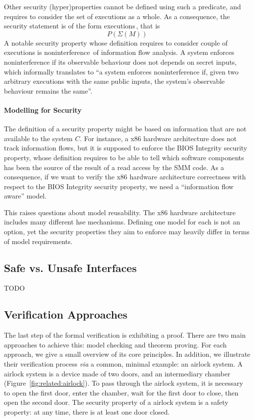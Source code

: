 Other security (hyper)properties cannot be defined using such a predicate, and
requires to consider the set of executions as a whole. As a consequence, the
security statement is of the form
executions\,\cite{clarkson2010hyperproperties}, that is
%
\[
  P(\Sigma(M))
\]
%
A notable security property whose definition requires to consider couple of
executions is noninterference\,\cite{goguen1982security} of information flow
analysis.
%
A system enforces noninterference if its observable behaviour does not depends
on secret inputs, which informally translates to ``a system enforces
noninterference if, given two arbitrary executions with the same public inputs,
the system's observable behaviour remains the same''.

\paragraph{Modelling for Security}
%
The definition of a security property might be based on information that are not
available to the system $C$.
%
For instance, a x86 hardware architecture does not track information flows, but
it is supposed to enforce the BIOS Integrity security property, whose definition
requires to be able to tell which software components has been the source of the
result of a read access by the SMM code.
%
As a consequence, if we want to verify the x86 hardware architecture correctness
with respect to the BIOS Integrity security property, we need a ``information
flow aware'' model.

This raises questions about model reusability.
%
The x86 hardware architecture includes many different \ac{hse} mechanisms.
%
Defining one model for each is not an option, yet the security properties they
aim to enforce may heavily differ in terms of model requirements.

\subsection{Safe vs. Unsafe Interfaces}
%
TODO

\subsection{Verification Approaches}
\label{subsec:state:approaches}

The last step of the formal verification is exhibiting a proof.
%
There are two main approaches to achieve this: model checking and theorem
proving.
%
For each approach, we give a small overview of its core principles.
%
In addition, we illustrate their verification process \emph{via} a common,
minimal example: an airlock system.
%
A airlock system is a device made of two doors, and an intermediary chamber
(Figure~\ref{fig:related:airlock}).
%
To pass through the airlock system, it is necessary to open the first door,
enter the chamber, wait for the first door to close, then open the second door.
%
The security property of a airlock system is a safety property: at any time,
there is at least one door closed.

